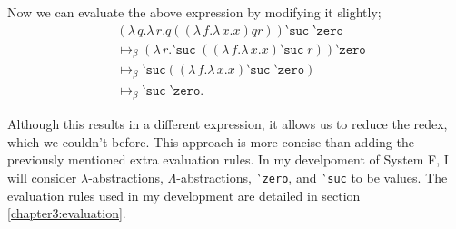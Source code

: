 Now we can evaluate the above expression by modifying it slightly;
\begin{align*}
  &(\lambda \, q. \lambda \, r. q ((\lambda \, f. \lambda \, x . x) q r))
    \texttt{‵suc} \;\texttt{‵zero}\\
  &\mapsto_{\beta} (
      \lambda \, r. \texttt{‵suc} \; ((\lambda \, f. \lambda \, x . x) \texttt{‵suc} \; r)
    )
    \texttt{‵zero}\\
  &\mapsto_{\beta} \texttt{‵suc} ((\lambda \, f. \lambda \, x . x) \texttt{‵suc} \; \texttt{‵zero})\\
  &\mapsto_{\beta} \texttt{‵suc} \; \texttt{‵zero}.
\end{align*}

Although this results in a different expression, it allows us to reduce the redex, which we couldn't
before. This approach is more concise than adding the previously mentioned extra evaluation rules.
In my develpoment of System F, I will consider $\lambda$-abstractions, $\Lambda$-abstractions,
\texttt{‵zero}, and \texttt{‵suc} to be values. The evaluation rules used in my development are
detailed in section \ref{chapter3:evaluation}.

